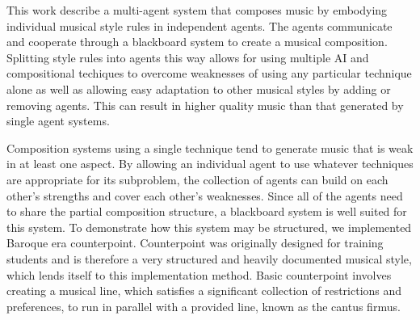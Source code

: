 

This work describe a multi-agent system that composes music by embodying individual musical style rules in independent agents.
The agents communicate and cooperate through a blackboard system to create a musical composition.
Splitting style rules into agents this way allows for using multiple AI and compositional techiques to overcome weaknesses of using any particular technique alone
	as well as allowing easy adaptation to other musical styles by adding or removing agents.
This can result in higher quality music than that generated by single agent systems.

Composition systems using a single technique tend to generate music that is weak in at least one aspect.
By allowing an individual agent to use whatever techniques are appropriate for its subproblem, the collection of agents can build on each other's strengths and cover each other's weaknesses.
Since all of the agents need to share the partial composition structure, a blackboard system is well suited for this system.
To demonstrate how this system may be structured, we implemented Baroque era counterpoint.
Counterpoint was originally designed for training students and is therefore a very structured and heavily documented musical style, which lends itself to this implementation method.
Basic counterpoint involves creating a musical line, which satisfies a significant collection of restrictions and preferences, to run in parallel with a provided line, known as the cantus firmus.
